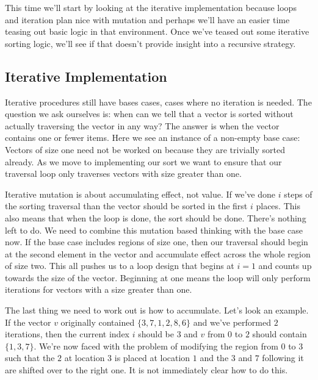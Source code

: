 \documentclass[]{tufte-handout}
\begin{document}
This time we'll start by looking at the iterative implementation because loops and iteration plan nice with mutation and perhaps we'll have an easier time teasing out basic logic in that environment. Once we've teased out some iterative sorting logic, we'll see if that doesn't provide insight into a recursive strategy.

\subsection{Iterative Implementation}

Iterative procedures still have bases cases, cases where no iteration is needed. The question we ask ourselves is: when can we tell that a vector is sorted without actually traversing the vector in any way? The answer is when the vector contains one or fewer items. Here we see an instance of a non-empty base case: Vectors of size one need not be worked on because they are trivially sorted already. As we move to implementing our sort we want to ensure that our traversal loop only traverses vectors with size greater than one. 

Iterative mutation is about accumulating effect, not value. If we've done $i$ steps of the sorting traversal than the vector should be sorted in the first $i$ places. This also means that when the loop is done, the sort should be done. There's nothing left to do. We need to combine this mutation based thinking with the base case now.  If the base case includes regions of size one, then our traversal should begin at the second element in the vector and accumulate effect across the whole region of size two. This all pushes us to a loop design that begins at $i=1$ and counts up towards the size of the vector. Beginning at one means the loop will only perform iterations for vectors with a size greater than one.

The last thing we need to work out is how to accumulate. Let's look an example. If the vector $v$ originally contained $\{3,7,1,2,8,6\}$ and we've performed $2$ iterations, then the current index $i$ should be $3$ and $v$ from $0$ to $2$ should contain $\{1,3,7\}$. We're now faced with the problem of modifying the region from $0$ to $3$ such that the $2$ at location $3$ is placed at location $1$ and the $3$ and $7$ following it are shifted over to the right one. It is not immediately clear how to do this. 
\end{document}
